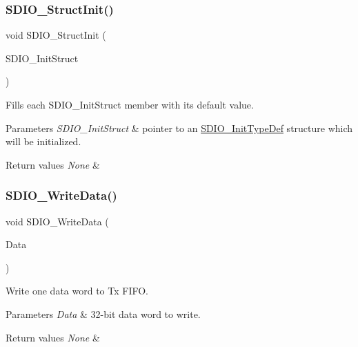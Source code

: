\subsubsection{\texorpdfstring{SDIO\_StructInit()}{SDIO\_StructInit()}}
{\footnotesize\ttfamily void S\+D\+I\+O\+\_\+\+Struct\+Init (\begin{DoxyParamCaption}\item[{\mbox{\hyperlink{struct_s_d_i_o___init_type_def}{S\+D\+I\+O\+\_\+\+Init\+Type\+Def}} $\ast$}]{S\+D\+I\+O\+\_\+\+Init\+Struct }\end{DoxyParamCaption})}



Fills each S\+D\+I\+O\+\_\+\+Init\+Struct member with its default value. 


\begin{DoxyParams}{Parameters}
{\em S\+D\+I\+O\+\_\+\+Init\+Struct} & pointer to an \mbox{\hyperlink{struct_s_d_i_o___init_type_def}{S\+D\+I\+O\+\_\+\+Init\+Type\+Def}} structure which will be initialized. \\
\hline
\end{DoxyParams}

\begin{DoxyRetVals}{Return values}
{\em None} & \\
\hline
\end{DoxyRetVals}
\mbox{\label{group___s_d_i_o___private___functions_ga361008b5252aa33b5f2b5823ee3d7240}} 
\subsubsection{\texorpdfstring{SDIO\_WriteData()}{SDIO\_WriteData()}}
{\footnotesize\ttfamily void S\+D\+I\+O\+\_\+\+Write\+Data (\begin{DoxyParamCaption}\item[{uint32\+\_\+t}]{Data }\end{DoxyParamCaption})}



Write one data word to Tx F\+I\+FO. 


\begin{DoxyParams}{Parameters}
{\em Data} & 32-\/bit data word to write. \\
\hline
\end{DoxyParams}

\begin{DoxyRetVals}{Return values}
{\em None} & \\
\hline
\end{DoxyRetVals}
